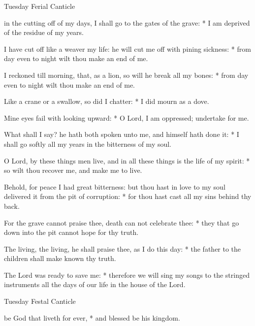 \begin{multicols}{2}
\begin{inhead}
Tuesday Ferial Canticle
\end{inhead}
 in the cutting off of my days, {\dag} I shall go to the gates of the grave: * I am deprived of the residue of my years.\par
{}
I have cut off like a weaver my life: {\dag} he will cut me off with pining sickness: * from day even to night wilt thou make an end of me.\par
I reckoned till morning, {\dag} that, as a lion, so will he break all my bones: * from day even to night wilt thou make an end of me.\par
Like a crane or a swallow, so did I chatter: * I did mourn as a dove.\par
Mine eyes fail with looking upward: * O Lord, I am oppressed; undertake for me.\par
What shall I say? {\dag} he hath both spoken unto me, and himself hath done it: * I shall go softly all my years in the bitterness of my soul.\par
O Lord, by these things men live, {\dag} and in all these things is the life of my spirit: * so wilt thou recover me, and make me to live.\par
Behold, for peace I had great bitterness: {\dag} but thou hast in love to my soul delivered it from the pit of corruption: * for thou hast cast all my sins behind thy back.\par
For the grave cannot praise thee, {\dag} death can not celebrate thee: * they that go down into the pit cannot hope for thy truth.\par
The living, the living, he shall praise thee, as I do this day: * the father to the children shall make known thy truth.\par
The Lord was ready to save me: * therefore we will sing my songs to the stringed instruments all the days of our life in the house of the Lord.
\begin{inhead}
Tuesday Festal Canticle
\end{inhead}
 be God that liveth for ever, * and blessed be his kingdom.\par
{}

\end{multicols}
